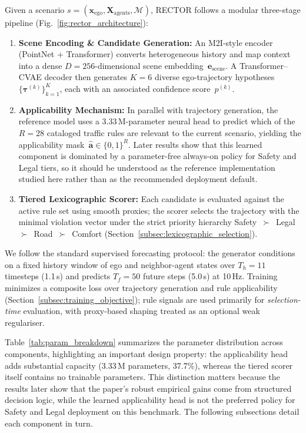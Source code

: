 Given a scenario $s{=}(\mathbf{x}_{\text{ego}},\mathbf{X}_{\text{agents}},\mathcal{M})$, RECTOR follows a modular three-stage pipeline (Fig.~\ref{fig:rector_architecture}):
\begin{enumerate}
    \item \textbf{Scene Encoding \& Candidate Generation:} An M2I-style encoder (PointNet + Transformer) converts heterogeneous history and map context into a dense $D{=}256$-dimensional scene     embedding~$\mathbf{e}_{\text{scene}}$.  A Transformer--CVAE decoder then generates $K{=}6$ diverse ego-trajectory hypotheses $\{\boldsymbol{\tau}^{(k)}\}_{k=1}^{K}$, each with an associated confidence score~$p^{(k)}$.
    \item \textbf{Applicability Mechanism:} In parallel with trajectory generation, the reference model uses a 3.33\,M-parameter neural head to predict which of the $R{=}28$ cataloged traffic rules are relevant to the current scenario, yielding the applicability mask~$\hat{\mathbf{a}}\in\{0,1\}^{R}$.  Later results show that this learned component is dominated by a parameter-free always-on policy for Safety and Legal tiers, so it should be understood as the reference implementation studied here rather than as the recommended deployment default.
    \item \textbf{Tiered Lexicographic Scorer:} Each candidate is evaluated against the active rule set using smooth proxies; the scorer selects the trajectory with the minimal violation vector under the strict priority hierarchy Safety~$\succ$~Legal~$\succ$~Road~$\succ$~Comfort (Section~\ref{subsec:lexicographic_selection}).
\end{enumerate}

\noindent
We follow the standard supervised forecasting protocol: the generator conditions on a fixed history window of ego and neighbor-agent states over $T_h{=}11$ timesteps (1.1\,s) and predicts $T_f{=}50$ future steps (5.0\,s) at 10\,Hz.  Training minimizes a composite loss over trajectory generation and rule applicability (Section~\ref{subsec:training_objective}); rule signals are used primarily for \emph{selection-time} evaluation, with proxy-based shaping treated as an optional weak regulariser.

Table~\ref{tab:param_breakdown} summarizes the parameter distribution across components, highlighting an important design property: the applicability head adds substantial capacity (3.33\,M parameters, 37.7\%), whereas the tiered scorer itself contains no trainable parameters.  This distinction matters because the results later show that the paper's robust empirical gains come from structured decision logic, while the learned applicability head is not the preferred policy for Safety and Legal deployment on this benchmark.  The following subsections detail each component in turn.

